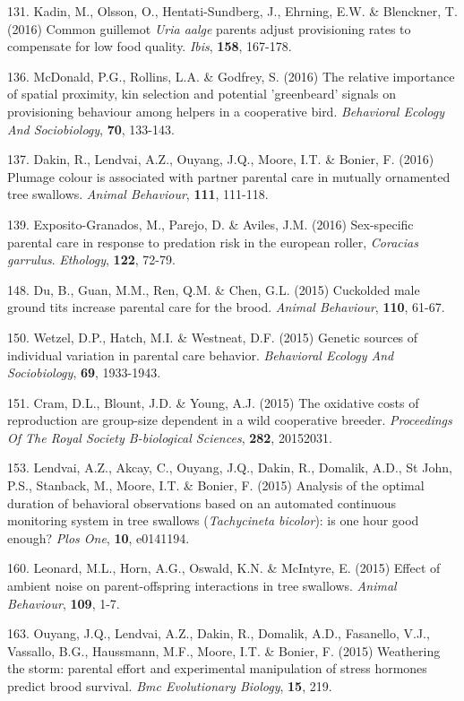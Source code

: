 131. Kadin, M., Olsson, O., Hentati-Sundberg, J., Ehrning, E.W. \&  Blenckner, T. (2016) Common guillemot \textit{Uria aalge} parents adjust provisioning rates to compensate for low food quality. \textit{Ibis},  \textbf{158}, 167-178.

136. McDonald, P.G., Rollins, L.A. \&  Godfrey, S. (2016) The relative importance of spatial proximity, kin selection and potential 'greenbeard' signals on provisioning behaviour among helpers in a cooperative bird. \textit{Behavioral Ecology And Sociobiology},  \textbf{70}, 133-143.

137. Dakin, R., Lendvai, A.Z., Ouyang, J.Q., Moore, I.T. \&  Bonier, F. (2016) Plumage colour is associated with partner parental care in mutually ornamented tree swallows. \textit{Animal Behaviour},  \textbf{111}, 111-118.

139. Exposito-Granados, M., Parejo, D. \&  Aviles, J.M. (2016) Sex-specific parental care in response to predation risk in the european roller, \textit{Coracias garrulus}. \textit{Ethology},  \textbf{122}, 72-79.

148. Du, B., Guan, M.M., Ren, Q.M. \&  Chen, G.L. (2015) Cuckolded male ground tits increase parental care for the brood. \textit{Animal Behaviour},  \textbf{110}, 61-67.

150. Wetzel, D.P., Hatch, M.I. \&  Westneat, D.F. (2015) Genetic sources of individual variation in parental care behavior. \textit{Behavioral Ecology And Sociobiology},  \textbf{69}, 1933-1943.

151. Cram, D.L., Blount, J.D. \&  Young, A.J. (2015) The oxidative costs of reproduction are group-size dependent in a wild cooperative breeder. \textit{Proceedings Of The Royal Society B-biological Sciences},  \textbf{282}, 20152031.

153. Lendvai, A.Z., Akcay, C., Ouyang, J.Q., Dakin, R., Domalik, A.D., St John, P.S., Stanback, M., Moore, I.T. \&  Bonier, F. (2015) Analysis of the optimal duration of behavioral observations based on an automated continuous monitoring system in tree swallows (\textit{Tachycineta bicolor}): is one hour good enough? \textit{Plos One},  \textbf{10}, e0141194.

160. Leonard, M.L., Horn, A.G., Oswald, K.N. \&  McIntyre, E. (2015) Effect of ambient noise on parent-offspring interactions in tree swallows. \textit{Animal Behaviour},  \textbf{109}, 1-7.

163. Ouyang, J.Q., Lendvai, A.Z., Dakin, R., Domalik, A.D., Fasanello, V.J., Vassallo, B.G., Haussmann, M.F., Moore, I.T. \&  Bonier, F. (2015) Weathering the storm: parental effort and experimental manipulation of stress hormones predict brood survival. \textit{Bmc Evolutionary Biology},  \textbf{15}, 219.

